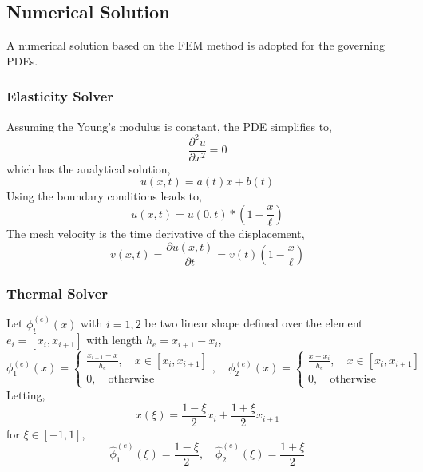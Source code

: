 \subsection{Numerical Solution}

A numerical solution based on the FEM method is adopted for the governing PDEs. 

\subsubsection{Elasticity Solver}

Assuming the Young's modulus is constant, the PDE simplifies to,
\begin{equation}
    \frac{\partial^2 u}{\partial x^2} = 0
\end{equation}
which has the analytical solution,
\begin{equation}
    u(x,t) = a(t)x + b(t)
\end{equation}
Using the boundary conditions leads to,
\begin{equation}
    u(x,t) = u(0,t) * \left(1 - \frac{x}{\ell}\right)
\end{equation}
The mesh velocity is the time derivative of the displacement,
\begin{equation}
    v(x,t) = \frac{\partial u(x,t)}{\partial t} = v(t)\left(1 - \frac{x}{\ell}\right)
\end{equation}

\subsubsection{Thermal Solver}

Let $\phi^{(e)}_i(x)$ with $i=1,2$ be two linear shape defined over the element $e_i=[x_{i},x_{i+1}]$ with length $h_e=x_{i+1} - x_i$,
\begin{equation}
    \phi^{(e)}_1(x) = \left\{\begin{matrix}
        \frac{x_{i+1} - x}{h_e},\quad x\in[x_i,x_{i+1}]\\
        0, \quad \text{otherwise}
    \end{matrix}\right.,\quad\phi^{(e)}_2(x) = \left\{\begin{matrix}
        \frac{x - x_i}{h_e},\quad x\in[x_i,x_{i+1}]\\
        0, \quad \text{otherwise}
    \end{matrix}\right.
\end{equation}
Letting,
\[
    x(\xi) = \frac{1-\xi}{2}x_i + \frac{1 + \xi}{2}x_{i+1}
\]
for $\xi\in[-1,1]$,
\begin{equation}
    \hat{\phi}_1^{(e)}(\xi) = \frac{1 - \xi}{2},\quad \hat{\phi}_2^{(e)}(\xi) = \frac{1 + \xi}{2}
\end{equation}

